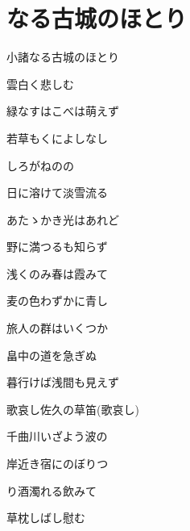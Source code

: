 \section{なる古城のほとり}

小諸なる古城のほとり

雲白く悲しむ

緑なすはこべは萌えず

若草もくによしなし

しろがねのの

日に溶けて淡雪流る



あたゝかき光はあれど

野に満つるも知らず

浅くのみ春は霞みて

麦の色わずかに青し

旅人の群はいくつか

畠中の道を急ぎぬ



暮行けば浅間も見えず

歌哀し佐久の草笛(歌哀し)

千曲川いざよう波の

岸近き宿にのぼりつ

り酒濁れる飲みて

草枕しばし慰む